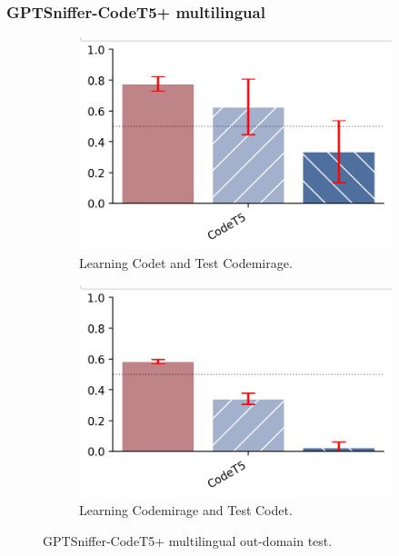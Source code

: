 \subsubsection{GPTSniffer-CodeT5+ multilingual}
\begin{figure}[H]
    \centering
    \begin{subfigure}[b]{0.45\textwidth}
        \centering
        \includegraphics[width=\linewidth]{img/TEST/CodeT5/CodetCodemirage/2ef26c58d4f174c215355c24b3d4e7d4bc89fe05e63f3fa600285073.png}
        \caption{Learning Codet and Test Codemirage.}
        \label{fig:4}
    \end{subfigure}
    \hfill
    \begin{subfigure}[b]{0.45\textwidth}
        \centering
        \includegraphics[width=\linewidth]{img/TEST/CodeT5/CodemirageCodet/76676bd3977b817dc4335cf6a3db269d0438797cb232b85369aa3543.png}
        \caption{Learning Codemirage and Test Codet.}
        \label{fig:5}
    \end{subfigure}
    \caption{GPTSniffer-CodeT5+ multilingual out-domain test.}
    \label{fig:222}
\end{figure}

